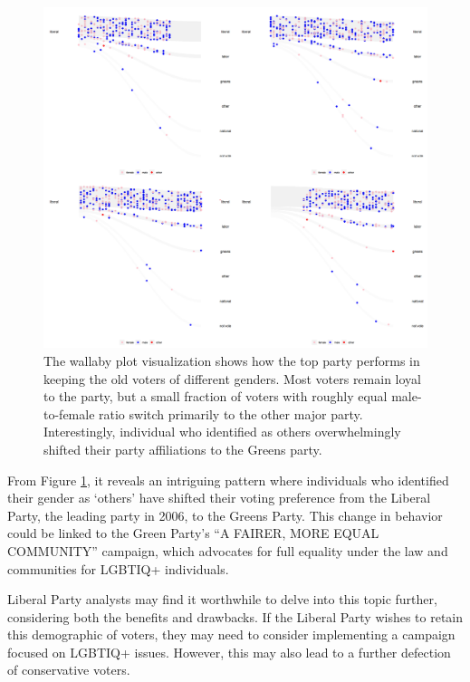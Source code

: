 \begin{figure}

{\centering \includegraphics[width=1\linewidth]{figures/animation-voter} 

}

\caption{The wallaby plot visualization shows how the top party performs in keeping the old voters of different genders. Most voters remain loyal to the party, but a small fraction of voters with roughly equal male-to-female ratio switch primarily to the other major party. Interestingly, individual who identified as others overwhelmingly shifted their party affiliations to the Greens party.}\label{fig:voter-figure}
\end{figure}

From Figure \ref{fig:voter-figure}, it reveals an intriguing pattern where individuals who identified their gender as `others' have shifted their voting preference from the Liberal Party, the leading party in 2006, to the Greens Party. This change in behavior could be linked to the Green Party's ``A FAIRER, MORE EQUAL COMMUNITY'' campaign, which advocates for full equality under the law and communities for LGBTIQ+ individuals.

Liberal Party analysts may find it worthwhile to delve into this topic further, considering both the benefits and drawbacks. If the Liberal Party wishes to retain this demographic of voters, they may need to consider implementing a campaign focused on LGBTIQ+ issues. However, this may also lead to a further defection of conservative voters.

